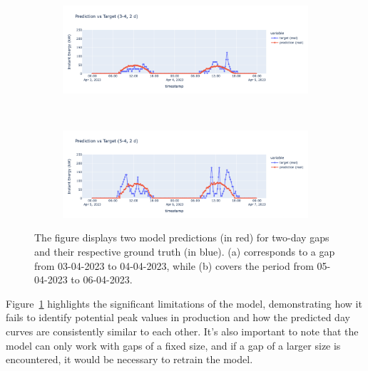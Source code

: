 \begin{figure}[H]
	\centering
	\begin{subfigure}{\textwidth}
		\centering
		\includegraphics[width=.8\textwidth]{chapters/3_models/imgs/ufnc/eval/ufcpred3-4.png}
		\caption{}
	\end{subfigure}\\
	\begin{subfigure}{\textwidth}
		\centering
		\includegraphics[width=.8\textwidth]{chapters/3_models/imgs/ufnc/eval/ufcpred5-4.png}
		\caption{}
	\end{subfigure}
	\caption{The figure displays two model predictions (in red) for two-day gaps and their respective ground truth (in blue). (a) corresponds to a gap from 03-04-2023 to 04-04-2023, while (b) covers the period from 05-04-2023 to 06-04-2023.}
	\label{fig:ufcnevalbrutti}
\end{figure}

Figure~\ref{fig:ufcnevalbrutti} highlights the significant limitations
of the model, demonstrating how it fails to identify potential peak
values in production and how the predicted day curves are consistently similar
to each other.
It's also important to note that the model can only work with
gaps of a fixed size, and if a gap of a larger size is encountered,
it would be necessary to retrain the model.



